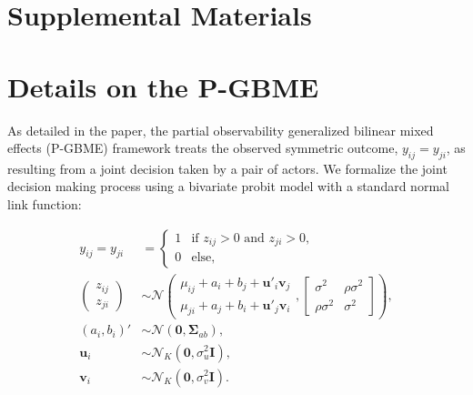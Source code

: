 \documentclass[a4paper, 12pt]{article}
\begin{document}
\clearpage

\appendix
\renewcommand{\thefigure}{\arabic{figure}}
\setcounter{figure}{0}
\renewcommand{\thetable}{\thesection \arabic{table}}
\setcounter{table}{0}
\setcounter{section}{0}
\appendix

\section*{\textbf{Supplemental Materials}}

\section{Details on the P-GBME}

As detailed in the paper, the partial observability generalized bilinear mixed effects (P-GBME) framework treats the observed symmetric outcome, $y_{ij} = y_{ji}$, as resulting from a joint decision taken by a pair of actors. We formalize the joint decision making process using a bivariate probit model with a standard normal link function:

\begin{align}
y_{ij} = y_{ji} & =   \left\{ \begin{array}{ll}
         1 & \mbox{if $z_{ij} > 0$ and $z_{ji} > 0$},\\
         0 & \mbox{else},\end{array} \right. \label{mod:y}\\
    \left ( \begin{array}{c}
         z_{ij} \\
         z_{ji} \end{array} \right ) 
         & \sim \mathcal{N}
        \left ( \begin{array}{c}
         \mu_{ij} + a_i + b_j +    \bm{u}'_i\bm{v}_j  \\
         \mu_{ji} + a_j + b_i +  \bm{u}'_j\bm{v}_i \end{array}, \left [ \begin{array}{cc}
        \sigma^2 & \rho \sigma^2 \\
         \rho \sigma^2 & \sigma^2 \end{array} \right] \right ), \label{eq:modz}\\
        (a_i, b_i)' & \sim \mathcal{N}\left(\bm{0}, \bm{\Sigma}_{ab} \right),\\
         \bm{u}_i & \sim \mathcal{N}_K(\bm{0}, \sigma_u^2\bm{I}),\\
         \bm{v}_i & \sim \mathcal{N}_K(\bm{0}, \sigma_v^2\bm{I})\label{eq:modv}.
\end{align}
\end{document}
